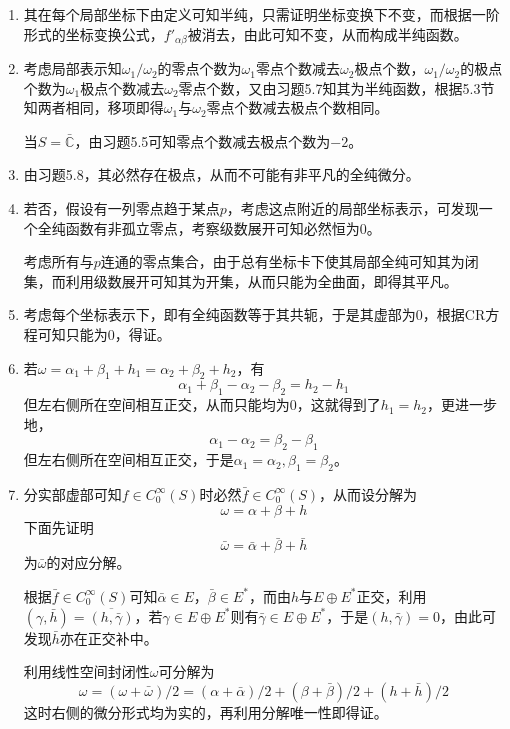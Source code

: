 \documentclass[a4paper,UTF8,fontset=windows,10pt]{ctexart}
\begin{document}
\begin{enumerate}
    \item 其在每个局部坐标下由定义可知半纯，只需证明坐标变换下不变，而根据一阶形式的坐标变换公式，$f'_{\alpha\beta}$被消去，由此可知不变，从而构成半纯函数。

    \item 考虑局部表示知$\omega_1/\omega_2$的零点个数为$\omega_1$零点个数减去$\omega_2$极点个数，$\omega_1/\omega_2$的极点个数为$\omega_1$极点个数减去$\omega_2$零点个数，又由习题5.7知其为半纯函数，根据5.3节知两者相同，移项即得$\omega_1$与$\omega_2$零点个数减去极点个数相同。
    
    当$S=\bar{\mathbb{C}}$，由习题5.5可知零点个数减去极点个数为$-2$。

    \item 由习题5.8，其必然存在极点，从而不可能有非平凡的全纯微分。
    
    \item 若否，假设有一列零点趋于某点$p$，考虑这点附近的局部坐标表示，可发现一个全纯函数有非孤立零点，考察级数展开可知必然恒为0。
    
    考虑所有与$p$连通的零点集合，由于总有坐标卡下使其局部全纯可知其为闭集，而利用级数展开可知其为开集，从而只能为全曲面，即得其平凡。

    \item 考虑每个坐标表示下，即有全纯函数等于其共轭，于是其虚部为0，根据CR方程可知只能为0，得证。
    
    \item 若$\omega=\alpha_1+\beta_1+h_1=\alpha_2+\beta_2+h_2$，有
    $$\alpha_1+\beta_1-\alpha_2-\beta_2=h_2-h_1$$
    但左右侧所在空间相互正交，从而只能均为0，这就得到了$h_1=h_2$，更进一步地，
    $$\alpha_1-\alpha_2=\beta_2-\beta_1$$
    但左右侧所在空间相互正交，于是$\alpha_1=\alpha_2,\beta_1=\beta_2$。
    
    \item 分实部虚部可知$f\in C_0^\infty(S)$时必然$\bar{f}\in C_0^\infty(S)$，从而设分解为
    $$\omega=\alpha+\beta+h$$
    下面先证明
    $$\bar\omega=\bar\alpha+\bar\beta+\bar{h}$$
    为$\bar\omega$的对应分解。
    
    根据$\bar{f}\in C_0^\infty(S)$可知$\bar\alpha\in E$，$\bar\beta\in E^*$，而由$h$与$E\oplus E^*$正交，利用$(\gamma,\bar h)=\overline{(h,\bar\gamma)}$，若$\gamma\in E\oplus E^*$则有$\bar\gamma\in E\oplus E^*$，于是$(h,\bar\gamma)=0$，由此可发现$\bar h$亦在正交补中。

    利用线性空间封闭性$\omega$可分解为
    $$\omega=(\omega+\bar\omega)/2=(\alpha+\bar\alpha)/2+(\beta+\bar\beta)/2+(h+\bar{h})/2$$
    这时右侧的微分形式均为实的，再利用分解唯一性即得证。


\end{enumerate}
\end{document}
